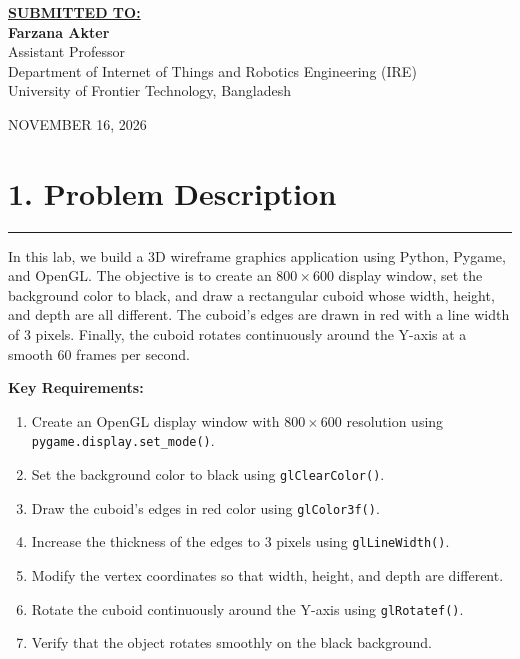 \documentclass[11pt,a4paper]{article}
\begin{document}
\begin{titlepage}
    {\small \textbf{\underline{SUBMITTED TO:}}}\\[0.22cm]
    {\large \textbf{Farzana Akter}}\\[0.14cm]
    {\small Assistant Professor}\\[0.1cm]
    {\footnotesize Department of Internet of Things and Robotics Engineering (IRE)}\\[0.08cm]
    {\footnotesize University of Frontier Technology, Bangladesh}

    \vfill
    {\footnotesize NOVEMBER 16, 2026}
    \vspace*{0.3cm}
\end{titlepage}

\newpage
{}

\section*{1. Problem Description}
\noindent\rule{\textwidth}{0.6pt}\vspace{0.15cm}

In this lab, we build a 3D wireframe graphics application using Python, Pygame, and OpenGL. The objective is to create an $800 \times 600$ display window, set the background color to black, and draw a rectangular cuboid whose width, height, and depth are all different. The cuboid's edges are drawn in red with a line width of 3 pixels. Finally, the cuboid rotates continuously around the Y-axis at a smooth 60 frames per second.

\vspace{0.2cm}
\noindent\textbf{Key Requirements:}
\begin{enumerate}
    \item Create an OpenGL display window with $800 \times 600$ resolution using \texttt{pygame.display.set\_mode()}.
    \item Set the background color to black using \texttt{glClearColor()}.
    \item Draw the cuboid's edges in red color using \texttt{glColor3f()}.
    \item Increase the thickness of the edges to 3 pixels using \texttt{glLineWidth()}.
    \item Modify the vertex coordinates so that width, height, and depth are different.
    \item Rotate the cuboid continuously around the Y-axis using \texttt{glRotatef()}.
    \item Verify that the object rotates smoothly on the black background.
\end{enumerate}
\end{document}
